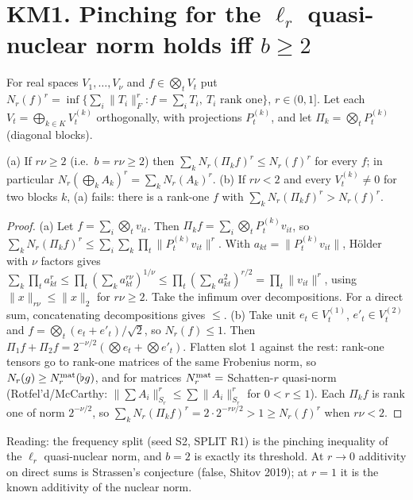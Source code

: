 \documentclass[11pt]{article}
\begin{document}
\section*{KM1. Pinching for the $\ell_r$ quasi-nuclear norm holds iff $b\ge2$}
For real spaces $V_1,\dots,V_\nu$ and $f\in\bigotimes_tV_t$ put $N_r(f)^r=\inf\{\sum_i\|T_i\|_F^r: f=\sum_iT_i,\ T_i \text{ rank one}\}$, $r\in(0,1]$.
Let each $V_t=\bigoplus_{k\in K}V_t^{(k)}$ orthogonally, with projections $P^{(k)}_t$, and let $\Pi_k=\bigotimes_tP^{(k)}_t$ (diagonal blocks).
\begin{proposition}
(a) If $r\nu\ge2$ (i.e.\ $b=r\nu\ge2$) then $\sum_kN_r(\Pi_kf)^r\le N_r(f)^r$ for every $f$; in particular $N_r(\bigoplus_kA_k)^r=\sum_kN_r(A_k)^r$.
(b) If $r\nu<2$ and every $V_t^{(k)}\neq0$ for two blocks $k$, (a) fails: there is a rank-one $f$ with $\sum_kN_r(\Pi_kf)^r>N_r(f)^r$.
\end{proposition}
\begin{proof}
(a) Let $f=\sum_i\bigotimes_tv_{it}$. Then $\Pi_kf=\sum_i\bigotimes_tP^{(k)}_tv_{it}$, so $\sum_kN_r(\Pi_kf)^r\le\sum_i\sum_k\prod_t\|P^{(k)}_tv_{it}\|^r$.
With $a_{kt}=\|P_t^{(k)}v_{it}\|$, H\"older with $\nu$ factors gives $\sum_k\prod_ta_{kt}^r\le\prod_t(\sum_ka_{kt}^{r\nu})^{1/\nu}\le\prod_t(\sum_ka_{kt}^2)^{r/2}=\prod_t\|v_{it}\|^r$,
using $\|x\|_{r\nu}\le\|x\|_2$ for $r\nu\ge2$. Take the infimum over decompositions. For a direct sum, concatenating decompositions gives $\le$.
(b) Take unit $e_t\in V_t^{(1)}$, $e'_t\in V_t^{(2)}$ and $f=\bigotimes_t(e_t+e'_t)/\sqrt2$, so $N_r(f)\le1$. Then $\Pi_1f+\Pi_2f=2^{-\nu/2}(\bigotimes e_t+\bigotimes e'_t)$.
Flatten slot 1 against the rest: rank-one tensors go to rank-one matrices of the same Frobenius norm, so $N_r(g)\ge N_r^{\rm mat}(\flat g)$, and for matrices
$N_r^{\rm mat}=$ Schatten-$r$ quasi-norm (Rotfel'd/McCarthy: $\|\sum A_i\|_{S_r}^r\le\sum\|A_i\|_{S_r}^r$ for $0<r\le1$). Each $\Pi_kf$ is rank one of norm $2^{-\nu/2}$,
so $\sum_kN_r(\Pi_kf)^r=2\cdot2^{-r\nu/2}>1\ge N_r(f)^r$ when $r\nu<2$.
\end{proof}
Reading: the frequency split (seed S2, SPLIT R1) is the pinching inequality of the $\ell_r$ quasi-nuclear norm, and $b=2$ is exactly its threshold.
At $r\to0$ additivity on direct sums is Strassen's conjecture (false, Shitov 2019); at $r=1$ it is the known additivity of the nuclear norm.
\end{document}
